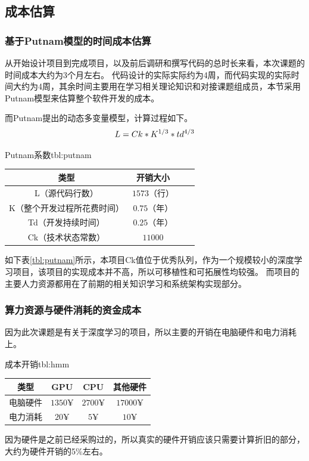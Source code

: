 \documentclass[supercite]{HustGraduPaper}
\theoremstyle{definition}
\begin{document}
\subsection{成本估算}

\subsubsection{基于Putnam模型的时间成本估算}
从开始设计项目到完成项目，以及前后调研和撰写代码的总时长来看，本次课题的时间成本大约为3个月左右。
代码设计的实际实际约为4周，而代码实现的实际时间大约为4周，其余时间主要用在学习相关理论知识和对接课题组成员，本节采用
Putnam模型\cite{王红珍2012软件开发成本估算模型的研究}来估算整个软件开发的成本。

而Putnam提出的动态多变量模型，计算过程如下。
\begin{align}
  L = Ck * K^{1/3} * td^{4/3} \notag
\end{align}

\begin{generaltab}{Putnam系数}{tbl:putnam}
  \begin{tabular}{c|ccc}
    \toprule
    类型 & 开销大小 \\
    \midrule
    L（源代码行数） & $1573$（行） \\
    K（整个开发过程所花费时间） & $0.75$（年）\\
    Td（开发持续时间）& $0.25$（年）\\
    Ck（技术状态常数）& $11000$ \\
    \bottomrule
  \end{tabular}
\end{generaltab}
如下表\ref{tbl:putnam}所示，本项目Ck值位于优秀队列，作为一个规模较小的深度学习项目，该项目的实现成本并不高，所以可移植性和可拓展性均较强。
而项目的主要人力资源都用在了前期的相关知识学习和系统架构实现部分。

\subsubsection{算力资源与硬件消耗的资金成本}
因为此次课题是有关于深度学习的项目，所以主要的开销在电脑硬件和电力消耗上。
\begin{generaltab}{成本开销}{tbl:hmm}
  \begin{tabular}{c|ccc}
    \toprule
    类型 & GPU & CPU & 其他硬件 \\
    \midrule
    电脑硬件 & $1350¥$ & $2700¥$ & $17000¥$ \\
    电力消耗 & $20¥$ & $5¥$ & $10¥$ \\
    \bottomrule
  \end{tabular}
\end{generaltab}
因为硬件是之前已经采购过的，所以真实的硬件开销应该只需要计算折旧的部分，大约为硬件开销的5\%左右。
\end{document}
